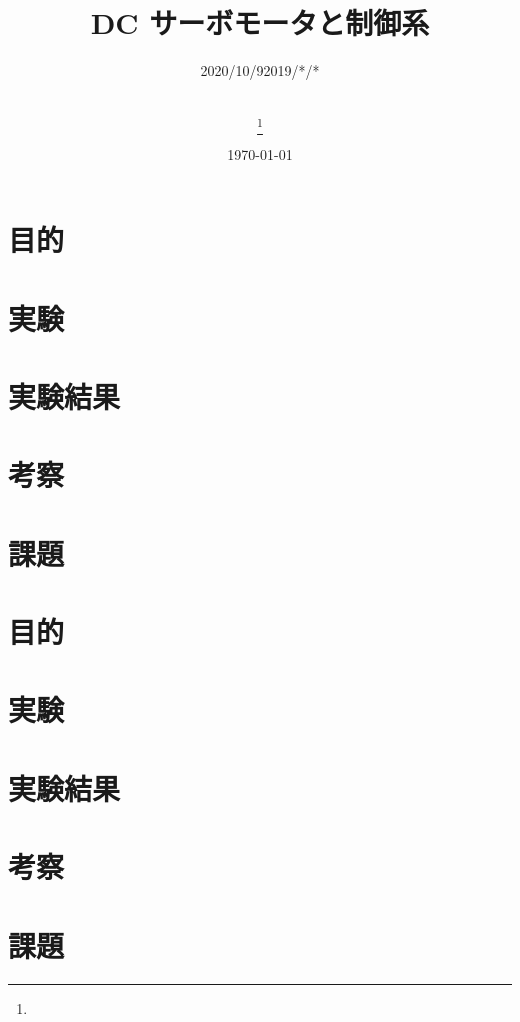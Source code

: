\documentclass[uplatex, 11pt,a4j, titlepage]{jsarticle}
\title{DC サーボモータと制御系}
\date{\today}
\author{
    \small{\myid} \\
    \myname\thanks{\mymail}
}
\begin{document}
\maketitle


\subtitle{2020/10/9}

\section{目的}
\section{実験}
\section{実験結果}
\section{考察}
\section{課題}


\newpage
\resetcounters


\subtitle{2019/*/*}

\section{目的}
\section{実験}
\section{実験結果}
\section{考察}
\section{課題}


\newpage
\resetcounters
\end{document}
